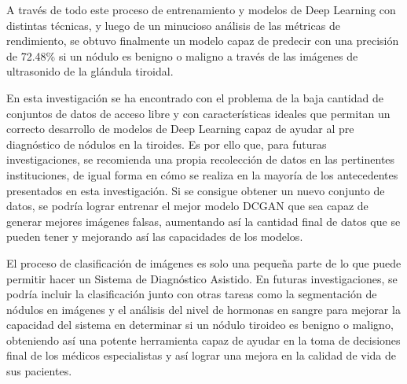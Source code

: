 A través de todo este proceso de entrenamiento y modelos de Deep Learning con distintas técnicas, y luego de un minucioso análisis de las métricas de rendimiento, se obtuvo finalmente un modelo capaz de predecir con una precisión de 72.48\% si un nódulo es benigno o maligno a través de las imágenes de ultrasonido de la glándula tiroidal.

En esta investigación se ha encontrado con el problema de la baja cantidad de conjuntos de datos de acceso libre y con características ideales que permitan un correcto desarrollo de modelos de Deep Learning capaz de ayudar al pre diagnóstico de nódulos en la tiroides. Es por ello que, para futuras investigaciones, se recomienda una propia recolección de datos en las pertinentes instituciones, de igual forma en cómo se realiza en la mayoría de los antecedentes presentados en esta investigación. Si se consigue obtener un nuevo conjunto de datos, se podría lograr entrenar el mejor modelo DCGAN que sea capaz de generar mejores imágenes falsas, aumentando así la cantidad final de datos que se pueden tener y mejorando así las capacidades de los modelos.

El proceso de clasificación de imágenes es solo una pequeña parte de lo que puede permitir hacer un Sistema de Diagnóstico Asistido. En futuras investigaciones, se podría incluir la clasificación junto con otras tareas como la segmentación de nódulos en imágenes y el análisis del nivel de hormonas en sangre para mejorar la capacidad del sistema en determinar si un nódulo tiroideo es benigno o maligno, obteniendo así una potente herramienta capaz de ayudar en la toma de decisiones final de los médicos especialistas y así lograr una mejora en la calidad de vida de sus pacientes.

